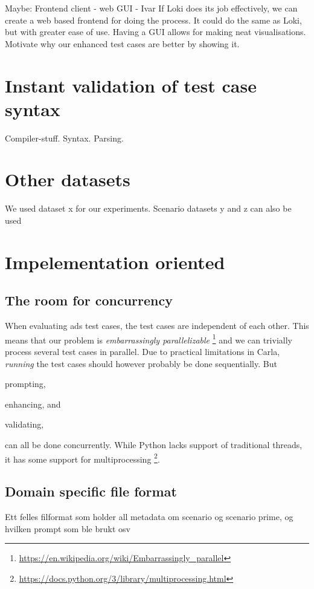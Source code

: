 Maybe: Frontend client - web GUI - Ivar
If Loki does its job effectively, we can create a web based frontend for doing the process. It could do the same as Loki, but with greater ease of use.
Having a GUI allows for making neat visualisations.
Motivate why our enhanced test cases are better by showing it.

\section{Instant validation of test case syntax}
Compiler-stuff. Syntax. Parsing.


\section{Other datasets}

We used dataset x for our experiments. Scenario datasets y and z can also be used

\section{Impelementation oriented}

\subsection{The room for concurrency}

When evaluating \acrshort{ads} test cases, the test cases are independent of each
other. This means that our problem is \textit{embarrassingly parallelizable}
\footnote{\url{https://en.wikipedia.org/wiki/Embarrassingly_parallel}} and we can
trivially process several test cases in parallel. Due to practical limitations
in Carla, \textit{running} the test cases should however probably be done
sequentially. But \begin{inparaenum}
    \item prompting,
    \item enhancing, and
    \item validating,
\end{inparaenum}
can all be done concurrently. While Python lacks support of traditional threads,
it has some support for multiprocessing
\footnote{\url{https://docs.python.org/3/library/multiprocessing.html}}.

\subsection{Domain specific file format}

Ett felles filformat som holder all metadata om scenario og scenario prime, og
hvilken prompt som ble brukt osv